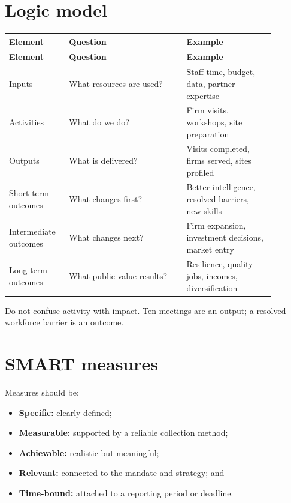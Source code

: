 \documentclass[11pt,letterpaper,oneside,openany]{book}
\begin{document}
\section[Logic model]{Logic model}
\begin{center}
\small
\setlength{\LTpre}{0.4em}
\setlength{\LTpost}{0.8em}
\begin{longtable}{>{\RaggedRight\arraybackslash}p{0.180\linewidth}>{\RaggedRight\arraybackslash}p{0.400\linewidth}>{\RaggedRight\arraybackslash}p{0.300\linewidth}}
\rowcolor{DeepNavy}
\color{white}\bfseries Element & \color{white}\bfseries Question & \color{white}\bfseries Example \\
\endfirsthead
\rowcolor{DeepNavy}
\color{white}\bfseries Element & \color{white}\bfseries Question & \color{white}\bfseries Example \\
\endhead
Inputs & What resources are used? & Staff time, budget, data, partner expertise \\
Activities & What do we do? & Firm visits, workshops, site preparation \\
Outputs & What is delivered? & Visits completed, firms served, sites profiled \\
Short-term outcomes & What changes first? & Better intelligence, resolved barriers, new skills \\
Intermediate outcomes & What changes next? & Firm expansion, investment decisions, market entry \\
Long-term outcomes & What public value results? & Resilience, quality jobs, incomes, diversification \\
\end{longtable}
\end{center}
Do not confuse activity with impact. Ten meetings are an output; a resolved workforce barrier is an outcome.


\section[SMART measures]{SMART measures}
Measures should be:


\begin{itemize}
\item \textbf{Specific:} clearly defined;
\item \textbf{Measurable:} supported by a reliable collection method;
\item \textbf{Achievable:} realistic but meaningful;
\item \textbf{Relevant:} connected to the mandate and strategy; and
\item \textbf{Time-bound:} attached to a reporting period or deadline.
\end{itemize}
\end{document}
